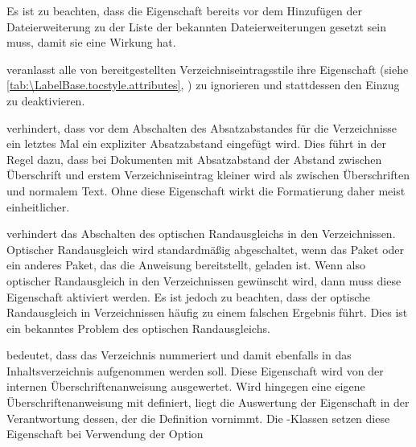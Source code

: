 \begin{description}
  Es ist zu beachten, dass die Eigenschaft bereits vor dem
  Hinzufügen der Dateierweiterung zu der Liste der bekannten
  Dateierweiterungen gesetzt sein muss, damit sie eine Wirkung hat.
\item[\PValue{noindent}] veranlasst alle
  von \KOMAScript{} bereitgestellten Verzeichniseintragsstile ihre Eigenschaft
   (siehe \autoref{tab:\LabelBase.tocstyle.attributes},
  ) zu ignorieren und
  stattdessen den Einzug zu deaktivieren.
\item[\PValue{noparskipfake}] verhindert,
  dass vor dem Abschalten des Absatzabstandes für die Verzeichnisse ein
  letztes Mal ein expliziter Absatzabstand eingefügt wird. Dies führt in der
  Regel dazu, dass bei Dokumenten mit Absatzabstand der Abstand zwischen
  Überschrift und erstem Verzeichniseintrag kleiner
  wird als zwischen Überschriften und normalem Text. %
  \iffalse%
  Normalerweise erhält man daher ohne diese Eigenschaft eine einheitlichere
  Formatierung.%
  \else%
  Ohne diese Eigenschaft wirkt die Formatierung daher meist einheitlicher.%
  \fi%
\item[\PValue{noprotrusion}] verhindert
  das Abschalten des optischen Randausgleichs in den Verzeichnissen. Optischer
  Randausgleich wird standardmäßig abgeschaltet, wenn das Paket
   oder ein anderes Paket, das die
  Anweisung  bereitstellt,
  geladen ist. Wenn also optischer Randausgleich in den Verzeichnissen
  gewünscht wird, dann muss diese Eigenschaft aktiviert
  werden. Es ist jedoch zu beachten, dass der optische
  Randausgleich in Verzeichnissen häufig zu einem falschen Ergebnis
  führt. Dies ist ein bekanntes Problem des optischen Randausgleichs.
\item[\PValue{numbered}] bedeutet, dass das Verzeichnis nummeriert und damit
  ebenfalls in das Inhaltsverzeichnis aufgenommen werden soll. Diese
  Eigenschaft wird von der internen Überschriftenanweisung ausgewertet. Wird
  hingegen eine eigene Überschriftenanweisung mit
   definiert, liegt die Auswertung der
  Eigenschaft in der Verantwortung dessen, der die Definition vornimmt.  Die
  \KOMAScript-Klassen setzen diese Eigenschaft bei Verwendung der Option

\end{description}
